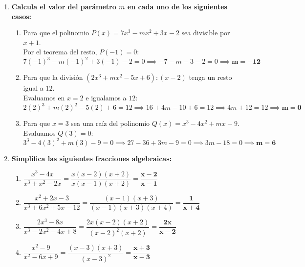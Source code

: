 \documentclass[11pt,a4paper]{article}
\begin{document}
\begin{enumerate}[label=\textbf{\arabic*.}, leftmargin=*]
    \item \textbf{Calcula el valor del parámetro {\color{numcolor}$m$} en cada uno de los siguientes casos:}
        \begin{enumerate}[label=\alph*), itemsep=0.8em]
            \item Para que el polinomio $P(x) = 7x^3 - mx^2 + 3x - 2$ sea divisible por $x + 1$.\\
             Por el teorema del resto, $P(-1) = 0$:
            $$7(-1)^3 - m(-1)^2 + 3(-1) - 2 = 0 \implies -7 - m - 3 - 2 = 0 \implies \mathbf{m = -12}$$
            
            \item Para que la división $(2x^3 + mx^2 - 5x + 6) : (x - 2)$ tenga un resto igual a $12$.\\
             Evaluamos en $x = 2$ e igualamos a $12$:
            $$2(2)^3 + m(2)^2 - 5(2) + 6 = 12 \implies 16 + 4m - 10 + 6 = 12 \implies 4m + 12 = 12 \implies \mathbf{m = 0}$$
            
            \item Para que $x = 3$ sea una raíz del polinomio $Q(x) = x^3 - 4x^2 + mx - 9$.\\
             Evaluamos $Q(3) = 0$:
            $$3^3 - 4(3)^2 + m(3) - 9 = 0 \implies 27 - 36 + 3m - 9 = 0 \implies 3m - 18 = 0 \implies \mathbf{m = 6}$$
        \end{enumerate}

    \item \textbf{Simplifica las siguientes fracciones algebraicas:}
        \begin{enumerate}[label=\alph*), itemsep=1em]
            \item $\dfrac{x^3 - 4x}{x^3 + x^2 - 2x} = \dfrac{x(x-2)(x+2)}{x(x-1)(x+2)} = \mathbf{\dfrac{x - 2}{x - 1}}$
            \item $\dfrac{x^2 + 2x - 3}{x^3 + 6x^2 + 5x - 12} = \dfrac{(x-1)(x+3)}{(x-1)(x+3)(x+4)} = \mathbf{\dfrac{1}{x + 4}}$
            \item $\dfrac{2x^3 - 8x}{x^3 - 2x^2 - 4x + 8} = \dfrac{2x(x-2)(x+2)}{(x-2)^2(x+2)} = \mathbf{\dfrac{2x}{x - 2}}$
            \item $\dfrac{x^2 - 9}{x^2 - 6x + 9} = \dfrac{(x-3)(x+3)}{(x-3)^2} = \mathbf{\dfrac{x + 3}{x - 3}}$
        \end{enumerate}


\end{enumerate}
\end{document}
